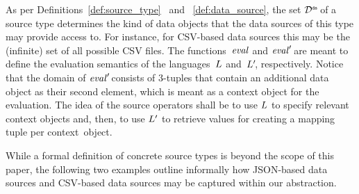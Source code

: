 As per Definitions~\ref{def:source_type}%
\ and~%
\ref{def:data_source}, the set $\mathcal{D}^\texttt{\tiny ds}\!$ of a source type
determines the kind of data objects that the data sources of this type may provide access to.
For instance, for CSV-based data sources this may be the (infinite) set of all possible CSV files.
The
functions~$\mathit{eval}$ and $\mathit{eval}'\!$ are meant to define the evaluation semantics of the languages~$L$ and~$L'\!$, respectively.
Notice that the domain of $\mathit{eval}'\!$ consists of 3-tuples that contain an additional data object as their second element, which is meant as a context object for the evaluation. The idea of the source operators shall be to use $L$ to specify relevant context objects and, then, to use $L'$ to retrieve values for
creating a mapping tuple
%
per
context~object.

While a formal definition of concrete source types is beyond the scope of this paper, the
following two examples outline informally how JSON-based data sources and CSV-based data sources may be captured within our abstraction.

\vspace{-1mm} %

